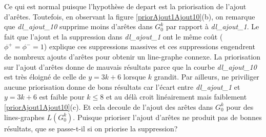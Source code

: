 \documentclass[onecolumn, 12pt]{book}
\begin{document}
Ce qui est normal puisque l'hypoth\`ese de depart est la priorisation de l'ajout d'ar\^etes. 
Toutefois, en observant la figure \ref{priorAjout1Ajout10}(b), on remarque que {\em dl\_ajout\_10} supprime moins d'ar\^etes dans $G_0^k$ par rapport \`a {\em dl\_ajout\_1}.
Le fait que  l'ajout et la suppression dans {\em dl\_ajout\_1} ont le m\^eme co\^ut ($\phi^{+} = \phi^{-} = 1$) explique ces suppressions massives et ces suppressions engendrent de nombreux ajouts d'ar\^etes pour obtenir un line-graphe connexe.
\newline
La priorisation sur l'ajout d'ar\^etes donne de mauvais r\'esultats parce que la courbe {\em dl\_ajout\_10} est tr\`es \'eloign\'e de celle de $y = 3k+6$ lorsque $k$ grandit.
Par ailleurs, ne priviliger aucune priorisation donne de bons r\'esultats car l'\'ecart entre {\em dl\_ajout\_1} et $y=3k+6$ est  faible pour $k \le 8$ et au d\'el\`a croit lin\'eairement mais faiblement  \ref{priorAjout1Ajout10}(c). Et cela decoule de l'ajout des ar\^etes dans $G_0^k$ pour des lines-graphes $L(G_0^k)$.  
\newline
Puisque prioriser l'ajout d'ar\^etes ne produit pas de bonnes r\'esultats, que se passe-t-il si on priorise la suppression?   


\end{document}
